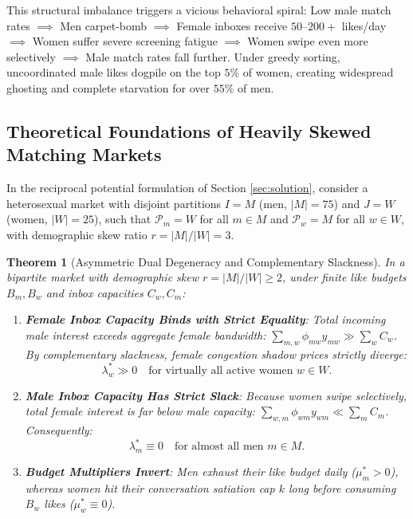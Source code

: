 \documentclass[11pt,letterpaper]{article}
\theoremstyle{definition}
\theoremstyle{plain}
\newtheorem{theorem}{Theorem}[section]
\theoremstyle{remark}
\begin{document}
\begin{warningbox}
This structural imbalance triggers a vicious behavioral spiral:
Low male match rates $\implies$ Men carpet-bomb $\implies$ Female inboxes receive $50\text{--}200+$ likes/day $\implies$ Women suffer severe screening fatigue $\implies$ Women swipe even more selectively $\implies$ Male match rates fall further.
Under greedy sorting, uncoordinated male likes dogpile on the top $5\%$ of women, creating widespread ghosting and complete starvation for over $55\%$ of men.
\end{warningbox}

\subsection{Theoretical Foundations of Heavily Skewed Matching Markets}
In the reciprocal potential formulation of Section \ref{sec:solution}, consider a heterosexual market with disjoint partitions $I = M$ (men, $|M| = 75$) and $J = W$ (women, $|W| = 25$), such that $\mathcal{P}_m = W$ for all $m \in M$ and $\mathcal{P}_w = M$ for all $w \in W$, with demographic skew ratio $r = |M|/|W| = 3$.

\begin{theorem}[Asymmetric Dual Degeneracy and Complementary Slackness]
\label{thm:asymmetric_slackness}
In a bipartite market with demographic skew $r = |M|/|W| \ge 2$, under finite like budgets $B_m, B_w$ and inbox capacities $C_w, C_m$:
\begin{enumerate}[leftmargin=1.5em]
    \item \textbf{Female Inbox Capacity Binds with Strict Equality}: Total incoming male interest exceeds aggregate female bandwidth: $\sum_{m, w} \phi_{mw} y_{mw} \gg \sum_w C_w$. By complementary slackness, female congestion shadow prices strictly diverge:
    \begin{equation}
        \lambda_w^* \gg 0 \quad \text{for virtually all active women } w \in W.
    \end{equation}
    \item \textbf{Male Inbox Capacity Has Strict Slack}: Because women swipe selectively, total female interest is far below male capacity: $\sum_{w, m} \phi_{wm} y_{wm} \ll \sum_m C_m$. Consequently:
    \begin{equation}
        \lambda_m^* \equiv 0 \quad \text{for almost all men } m \in M.
    \end{equation}
    \item \textbf{Budget Multipliers Invert}: Men exhaust their like budget daily ($\mu_m^* > 0$), whereas women hit their conversation satiation cap $k$ long before consuming $B_w$ likes ($\mu_w^* \equiv 0$).
\end{enumerate}
\end{theorem}
\end{document}
